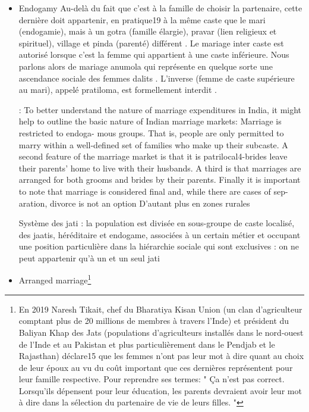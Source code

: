 \documentclass[a4paper, 11pt, onecolumn]{article}
\begin{document}
\begin{itemize}
\item Endogamy
Au-delà du fait que c’est à la famille de choisir la partenaire, cette dernière doit appartenir,
en pratique19 à la même caste que le mari (endogamie), mais à un gotra (famille élargie), pravar
(lien religieux et spirituel), village et pinda (parenté) différent \cite{Radhakrishnan1937}.
Le mariage inter caste est autorisé lorsque c’est la femme qui appartient à une caste inférieure. Nous parlons alors
de mariage anumola qui représente en quelque sorte une ascendance sociale des femmes dalits \cite{Ahuja2015}. L’inverse (femme de caste supérieure au mari), appelé pratiloma, est formellement interdit \cite{Radhakrishnan1937}.

\cite{Bloch2004} : 
To better understand the nature of marriage expenditures in India, it might help to
outline the basic nature of Indian marriage markets: Marriage is restricted to endoga-
mous groups. That is, people are only permitted to marry within a well-defined set of
families who make up their subcaste. A second feature of the marriage market is that
it is patrilocal4-brides leave their parents' home to live with their husbands. A third
is that marriages are arranged for both grooms and brides by their parents. Finally it
is important to note that marriage is considered final and, while there are cases of sep-
aration, divorce is not an option
D'autant plus en zones rurales

Système des jati : la population est divisée en sous-groupe de caste localisé, des jaatis, héréditaire et endogame, associées à un certain métier et occupant une position particulière dans la hiérarchie sociale qui sont exclusives
: on ne peut appartenir qu’à un et un seul jati

\item Arranged marriage\footnote{En 2019 Naresh Tikait, chef du Bharatiya Kisan Union
(un clan d’agriculteur comptant plus de 20 millions de membres à travers l’Inde) et président
du Baliyan Khap des Jats (populations d’agriculteurs installés dans le nord-ouest de l’Inde et
au Pakistan et plus particulièrement dans le Pendjab et le Rajasthan) déclare15 que les femmes
n’ont pas leur mot à dire quant au choix de leur époux au vu du coût important que ces dernières
représentent pour leur famille respective. Pour reprendre ses termes: " Ça n’est pas correct.
Lorsqu’ils dépensent pour leur éducation, les parents devraient avoir leur mot à dire dans la
sélection du partenaire de vie de leurs filles. "
}


\end{itemize}
\end{document}
